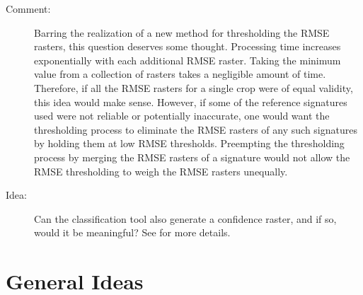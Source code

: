 \begin{description}
\item[Comment:] Barring the realization of a new method for thresholding the RMSE rasters, this question deserves some thought. Processing time increases exponentially with each additional RMSE raster. Taking the minimum value from a collection of rasters takes a negligible amount of time. Therefore, if all the RMSE rasters for a single crop were of equal validity, this idea would make sense. However, if some of the reference signatures used were not reliable or potentially inaccurate, one would want the thresholding process to eliminate the RMSE rasters of any such signatures by holding them at low RMSE thresholds. Preempting the thresholding process by merging the RMSE rasters of a signature would not allow the RMSE thresholding to weigh the RMSE rasters unequally.

\item[Idea:] Can the classification tool also generate a confidence raster, and if so, would it be meaningful? See 
for more details.
\end{description}

\section{General Ideas}

